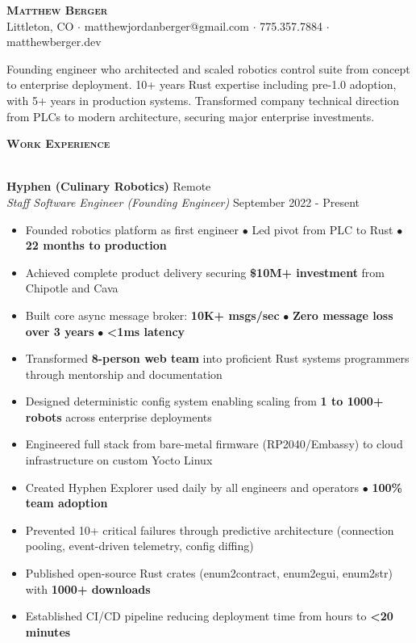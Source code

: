 \documentclass[a4paper]{article}
\newcommand{\lineunder} {
    \vspace*{-8pt} \\
    \hspace*{-18pt} \hrulefill \\
}
\newcommand{\header} [1] {
    {\hspace*{-18pt}\vspace*{6pt} \large \textbf{\textsc{#1}}}
    \vspace*{-6pt} \lineunder
    \vspace*{4pt}
}
\begin{document}
\vspace*{-40pt}

\begin{center}
    {\Huge \scshape \textbf{Matthew Berger}}\\
    \vspace*{4pt}
    Littleton, CO $\cdot$ matthewjordanberger@gmail.com $\cdot$ 775.357.7884 $\cdot$ matthewberger.dev\\
\end{center}

\vspace*{-6pt}
Founding engineer who architected and scaled robotics control suite from concept to enterprise deployment. 10+ years Rust expertise including pre-1.0 adoption, with 5+ years in production systems. Transformed company technical direction from PLCs to modern architecture, securing major enterprise investments.
\vspace*{8pt}

\header{Work Experience}

\textbf{Hyphen (Culinary Robotics)} \hfill Remote\\
\textit{Staff Software Engineer (Founding Engineer)} \hfill September 2022 - Present\\
\vspace{-1mm}
\begin{itemize} \itemsep 1pt
    \item Founded robotics platform as first engineer $\bullet$ Led pivot from PLC to Rust $\bullet$ \textbf{22 months to production}
    \item Achieved complete product delivery securing \textbf{\$10M+ investment} from Chipotle and Cava
    \item Built core async message broker: \textbf{10K+ msgs/sec} $\bullet$ \textbf{Zero message loss over 3 years} $\bullet$ \textbf{<1ms latency}
    \item Transformed \textbf{8-person web team} into proficient Rust systems programmers through mentorship and documentation
    \item Designed deterministic config system enabling scaling from \textbf{1 to 1000+ robots} across enterprise deployments
    \item Engineered full stack from bare-metal firmware (RP2040/Embassy) to cloud infrastructure on custom Yocto Linux
    \item Created Hyphen Explorer used daily by all engineers and operators $\bullet$ \textbf{100\% team adoption}
    \item Prevented 10+ critical failures through predictive architecture (connection pooling, event-driven telemetry, config diffing)
    \item Published open-source Rust crates (enum2contract, enum2egui, enum2str) with \textbf{1000+ downloads}
    \item Established CI/CD pipeline reducing deployment time from hours to \textbf{<20 minutes}
\end{itemize}
\end{document}
